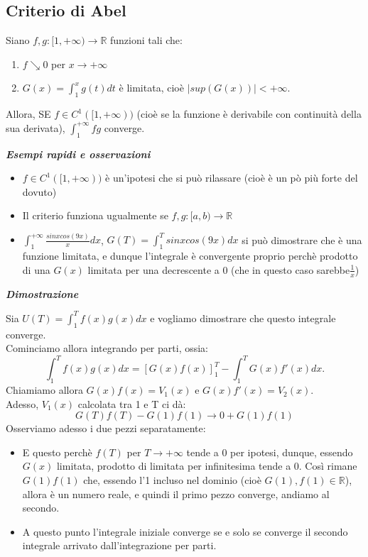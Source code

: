 \documentclass{article}
\theoremstyle{definition}
\newcommand{\R}{\mathbb{R}}
\begin{document}
\subsection{Criterio di Abel}
Siano $f,g : [1,+\infty) \to \R$ funzioni tali che:
\begin{enumerate}
    \item $f \searrow 0$ per $x \to +\infty$
    \item $G(x)=\int_1^x g(t)dt$ è limitata, cioè $|sup(G(x))| < +\infty$.
\end{enumerate}
Allora, SE $f \in C^1([1,+\infty))$ (cioè se la funzione è derivabile con continuità della sua derivata),  $\int_1^{+\infty}fg$ converge.
\begin{center}
    \textbf{\textit{Esempi rapidi e osservazioni}}
\end{center}
\begin{itemize}
    \item $f \in C^1([1,+\infty))$ è un'ipotesi che si può rilassare (cioè è un pò più forte del dovuto)
    \item Il criterio funziona ugualmente se $f,g: [a,b) \to \R$
    \item $\int_1^{+\infty}\frac{sinx cos(9x)}{x}dx$, $G(T)=\int_1^T sinx cos(9x) dx$ si può dimostrare che è una funzione limitata, e dunque l'integrale è convergente proprio perchè prodotto di una $G(x)$ limitata per una decrescente a 0 (che in questo caso sarebbe$\frac{1}{x}$)
\end{itemize}
\begin{center}
    \textbf{\textit{Dimostrazione}}
\end{center}
Sia $U(T)=\int_1^T f(x)g(x)dx$ e vogliamo dimostrare che questo integrale converge.
\\
Cominciamo allora integrando per parti, ossia:
\begin{equation*}
    \int_1^T f(x)g(x)dx= \left[G(x)f(x)\right]_1^T-\int_1^T G(x)f'(x)dx.
\end{equation*}
Chiamiamo allora $G(x)f(x)=V_1(x)$ e $G(x)f'(x)=V_2(x)$.
\\
Adesso, $V_1(x)$ calcolata tra 1 e T ci dà:
\begin{equation*}
    G(T)f(T)-G(1)f(1) \to 0+G(1)f(1)
\end{equation*}
Osserviamo adesso i due pezzi separatamente:
\begin{itemize}
\item E questo perchè $f(T)$ per $T \to +\infty$ tende a 0 per ipotesi, dunque, essendo $G(x)$ limitata, prodotto di limitata per infinitesima tende a 0. Così rimane $G(1)f(1)$ che, essendo l'1 incluso nel dominio (cioè $G(1), f(1) \in \R$), allora è un numero reale, e quindi il primo pezzo converge, andiamo al secondo.
\item A questo punto l'integrale iniziale converge se e solo se converge il secondo integrale arrivato dall'integrazione per parti.
\end{itemize}
\end{document}
